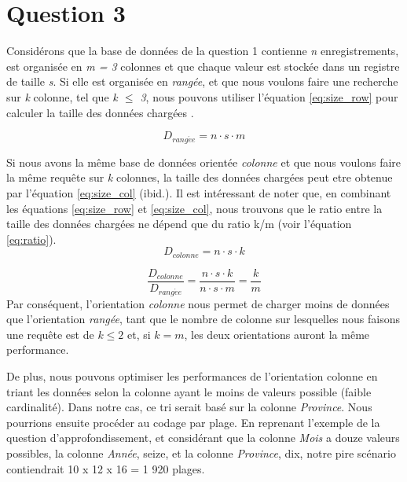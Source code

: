 \documentclass{article}
\numberwithin{equation}{section} %
\begin{document}
\section{Question 3}
Considérons que la base de données de la question 1 contienne \textit{n} enregistrements, est organisée en \textit{m = 3} colonnes et que chaque valeur est stockée dans un registre de taille \textit{s}. Si elle est organisée en \textit{rangée}, et que nous voulons faire une recherche sur \textit{k} colonne, tel que \textit{k $\leq$ 3}, nous pouvons utiliser l'équation \ref{eq:size_row} pour calculer la taille des données chargées \cite{ACM}.

\begin{equation}
    D_{rang\acute{e}e} = n \cdot s \cdot m
    \label{eq:size_row}
\end{equation}


Si nous avons la même base de données orientée \textit{colonne} et que nous voulons faire la même requête sur \textit{k} colonnes, la taille des données chargées peut etre obtenue par l'équation \ref{eq:size_col} (ibid.). Il est intéressant de noter que, en combinant les équations \ref{eq:size_row} et \ref{eq:size_col}, nous trouvons que le ratio entre la taille des données chargées ne dépend que du ratio k/m (voir l'équation \ref{eq:ratio}).
\begin{equation}
    D_{colonne} = n \cdot s \cdot k
    \label{eq:size_col}
\end{equation}

\begin{equation}
    \frac{D_{colonne}}{D_{rang\acute{e}e}} = \frac{n \cdot s \cdot k}{n \cdot s \cdot m} = \frac{k}{m}
    \label{eq:ratio}
\end{equation}
Par conséquent, l'orientation \textit{colonne} nous permet de charger moins de données que l'orientation \textit{rangée}, tant que le nombre de colonne sur lesquelles nous faisons une requête est de $k \leq 2$ et, si $k=m$, les deux orientations auront la même performance.



De plus, nous pouvons optimiser les performances de l'orientation colonne en triant les données selon la colonne ayant le moins de valeurs possible (faible cardinalité). Dans notre cas, ce tri serait basé sur la colonne \textit{Province}. Nous pourrions ensuite procéder au codage par plage. En reprenant l'exemple de la question d'approfondissement, et considérant que la colonne \textit{Mois} a douze valeurs possibles, la colonne \textit{Année}, seize, et la colonne \textit{Province}, dix, notre pire scénario contiendrait 10 x 12 x 16 = 1 920 plages. 
\end{document}
